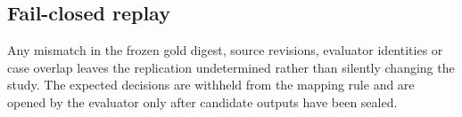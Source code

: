 \subsection{Fail-closed replay}

Any mismatch in the frozen gold digest, source revisions, evaluator identities
or case overlap leaves the replication undetermined rather than silently
changing the study. The expected decisions are withheld from the mapping rule
and are opened by the evaluator only after candidate outputs have been sealed.
\endinput
